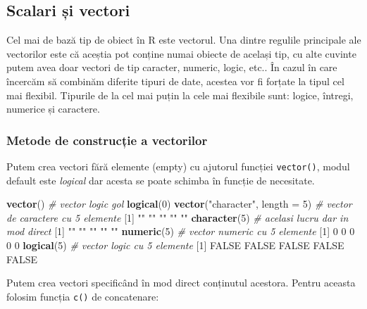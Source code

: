\documentclass[]{article}
\newenvironment{Shaded}{\begin{snugshade}}{\end{snugshade}}
\newcommand{\KeywordTok}[1]{\textcolor[rgb]{0.13,0.29,0.53}{\textbf{#1}}}
\newcommand{\DataTypeTok}[1]{\textcolor[rgb]{0.13,0.29,0.53}{#1}}
\newcommand{\DecValTok}[1]{\textcolor[rgb]{0.00,0.00,0.81}{#1}}
\newcommand{\StringTok}[1]{\textcolor[rgb]{0.31,0.60,0.02}{#1}}
\newcommand{\CommentTok}[1]{\textcolor[rgb]{0.56,0.35,0.01}{\textit{#1}}}
\newcommand{\OtherTok}[1]{\textcolor[rgb]{0.56,0.35,0.01}{#1}}
\newcommand{\NormalTok}[1]{#1}
\begin{document}
\subsection{Scalari și vectori}\label{scalari-si-vectori}

Cel mai de bază tip de obiect în R este vectorul. Una dintre regulile
principale ale vectorilor este că aceștia pot conține numai obiecte de
același tip, cu alte cuvinte putem avea doar vectori de tip caracter,
numeric, logic, etc.. În cazul în care încercăm să combinăm diferite
tipuri de date, acestea vor fi forțate la tipul cel mai flexibil.
Tipurile de la cel mai puțin la cele mai flexibile sunt: logice,
întregi, numerice și caractere.

\subsubsection{Metode de construcție a
vectorilor}\label{metode-de-constructie-a-vectorilor}

Putem crea vectori fără elemente (empty) cu ajutorul funcției
\texttt{vector()}, modul default este \emph{logical} dar acesta se poate
schimba în funcție de necesitate.

\begin{Shaded}
\begin{Highlighting}[]
\KeywordTok{vector}\NormalTok{() }\CommentTok{# vector logic gol}
\KeywordTok{logical}\NormalTok{(}\DecValTok{0}\NormalTok{)}
\KeywordTok{vector}\NormalTok{(}\StringTok{"character"}\NormalTok{, }\DataTypeTok{length =} \DecValTok{5}\NormalTok{) }\CommentTok{# vector de caractere cu 5 elemente}
\NormalTok{[}\DecValTok{1}\NormalTok{] }\StringTok{""} \StringTok{""} \StringTok{""} \StringTok{""} \StringTok{""}
\KeywordTok{character}\NormalTok{(}\DecValTok{5}\NormalTok{) }\CommentTok{# acelasi lucru dar in mod direct}
\NormalTok{[}\DecValTok{1}\NormalTok{] }\StringTok{""} \StringTok{""} \StringTok{""} \StringTok{""} \StringTok{""}
\KeywordTok{numeric}\NormalTok{(}\DecValTok{5}\NormalTok{)   }\CommentTok{# vector numeric cu 5 elemente}
\NormalTok{[}\DecValTok{1}\NormalTok{] }\DecValTok{0} \DecValTok{0} \DecValTok{0} \DecValTok{0} \DecValTok{0}
\KeywordTok{logical}\NormalTok{(}\DecValTok{5}\NormalTok{)   }\CommentTok{# vector logic cu 5 elemente}
\NormalTok{[}\DecValTok{1}\NormalTok{] }\OtherTok{FALSE} \OtherTok{FALSE} \OtherTok{FALSE} \OtherTok{FALSE} \OtherTok{FALSE}
\end{Highlighting}
\end{Shaded}

Putem crea vectori specificând în mod direct conținutul acestora. Pentru
aceasta folosim funcția \texttt{c()} de concatenare:
\end{document}
